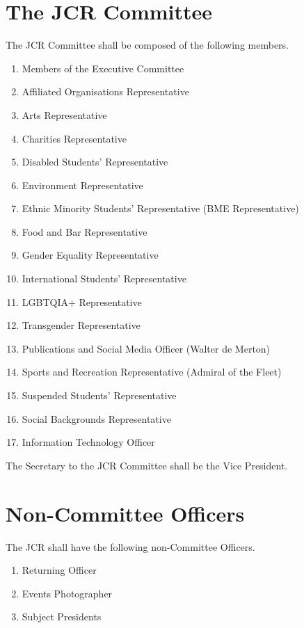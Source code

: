 \section{The JCR Committee}
\npara The JCR Committee shall be composed of the following members.
\begin{enumerate}
	\item Members of the Executive Committee
	\item Affiliated Organisations Representative
	\item Arts Representative
	\item Charities Representative
	\item Disabled Students' Representative
	\item Environment Representative
	\item Ethnic Minority Students' Representative (BME Representative)
	\item Food and Bar Representative
	\item Gender Equality Representative
	\item International Students' Representative
	\item LGBTQIA+ Representative
	\item Transgender Representative
	\item Publications and Social Media Officer (Walter de Merton)
	\item Sports and Recreation Representative (Admiral of the Fleet)
	\item Suspended Students' Representative
	\item Social Backgrounds Representative
	\item Information Technology Officer
\end{enumerate}
\npara The Secretary to the JCR Committee shall be the Vice President.
\section{Non-Committee Officers}
\npara The JCR shall have the following non-Committee Officers.
\begin{enumerate}
	\item Returning Officer
	\item Events Photographer
	\item Subject Presidents
\end{enumerate}
